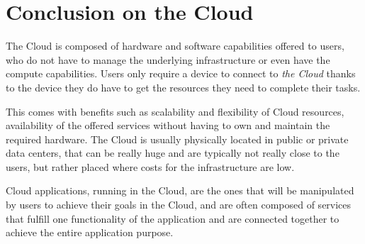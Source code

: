 






\section{Conclusion on the Cloud}
\label{sec:cccloud}

The Cloud is composed of hardware and software capabilities offered to
users, who do not have to manage the underlying infrastructure or even
have the compute capabilities.
%
Users only require a device to connect to \emph{the Cloud} thanks to
the device they do have to get the resources they need to complete
their tasks.

%
This comes with benefits such as scalability and flexibility of Cloud
resources, availability of the offered services without having to own
and maintain the required hardware.
%
The Cloud is usually physically located in public or private data
centers, that can be really huge and are typically not really close to
the users, but rather placed where costs for the infrastructure are low.

Cloud applications, running in the Cloud, are the ones that will be
manipulated by users to achieve their goals in the Cloud, and are
often composed of services that fulfill one functionality of the
application and are connected together to achieve the entire
application purpose.

